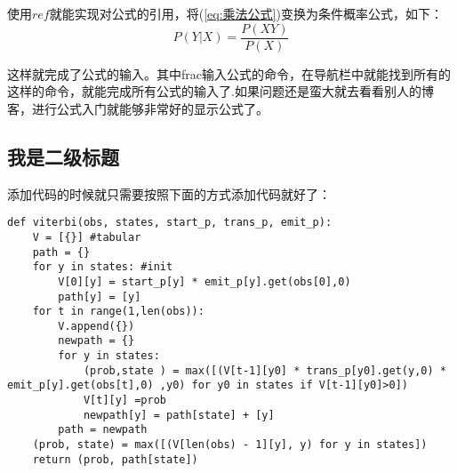 \documentclass[../document.tex]{subfiles}
\begin{document}
使用$ref$就能实现对公式的引用，将(\ref{eq:乘法公式})变换为条件概率公式，如下：
$$P(Y|X) = \frac{P(XY)}{P(X)}$$

这样就完成了公式的输入。其中frac输入公式的命令，在导航栏中就能找到所有的这样的命令，就能完成所有公式的输入了.如果问题还是蛮大就去看看别人的博客，进行公式入门就能够非常好的显示公式了。

\subsection{我是二级标题}

添加代码的时候就只需要按照下面的方式添加代码就好了：

\begin{lstlisting}
def viterbi(obs, states, start_p, trans_p, emit_p):
	V = [{}] #tabular
	path = {}
	for y in states: #init
		V[0][y] = start_p[y] * emit_p[y].get(obs[0],0)
		path[y] = [y]
	for t in range(1,len(obs)):
		V.append({})
		newpath = {}
		for y in states:
			(prob,state ) = max([(V[t-1][y0] * trans_p[y0].get(y,0) * emit_p[y].get(obs[t],0) ,y0) for y0 in states if V[t-1][y0]>0])
			V[t][y] =prob
			newpath[y] = path[state] + [y]
		path = newpath
	(prob, state) = max([(V[len(obs) - 1][y], y) for y in states])
	return (prob, path[state])
\end{lstlisting}
\end{document}
